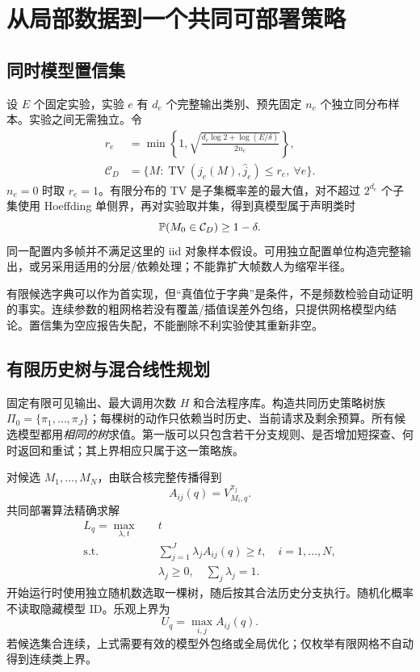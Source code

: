 \documentclass[11pt,a4paper,fontset=fandol]{ctexart}
\theoremstyle{definition}\newtheorem{definition}[theorem]{定义}
\theoremstyle{remark}\newtheorem{remark}[theorem]{说明}
\numberwithin{equation}{section}
\newcommand{\TV}{\operatorname{TV}}\newcommand{\osc}{\operatorname{osc}}
\newcommand{\cC}{\mathcal C}\newcommand{\cQ}{\mathcal Q}
\begin{document}
\section{从局部数据到一个共同可部署策略}
\label{sec:algorithm}
\subsection{同时模型置信集}
设 $E$ 个固定实验，实验 $e$ 有 $d_e$ 个完整输出类别、预先固定 $n_e$ 个独立同分布样本。实验之间无需独立。令
\begin{align}
 r_e&=\min\!\left\{1,\sqrt{\frac{d_e\log2+\log(E/\delta)}{2n_e}}\right\},\\
 \cC_D&=\{M:\TV(j_e(M),\widehat j_e)\le r_e,\ \forall e\}.
 \label{eq:confidence}
\end{align}
$n_e=0$ 时取 $r_e=1$。有限分布的 TV 是子集概率差的最大值，对不超过 $2^{d_e}$ 个子集使用 Hoeffding 单侧界，再对实验取并集，得到真模型属于声明类时
\begin{equation}
 \Prb(M_0\in\cC_D)\ge1-\delta.
 \label{eq:coverage}
\end{equation}
同一配置内多帧并不满足这里的 iid 对象样本假设。可用独立配置单位构造完整输出，或另采用适用的分层/依赖处理；不能靠扩大帧数人为缩窄半径。

有限候选字典可以作为首实现，但“真值位于字典”是条件，不是频数检验自动证明的事实。连续参数的粗网格若没有覆盖/插值误差外包络，只提供网格模型内结论。置信集为空应报告失配，不能删除不利实验使其重新非空。

\subsection{有限历史树与混合线性规划}
\label{sec:lp}
固定有限可见输出、最大调用次数 $H$ 和合法程序库。构造共同历史策略树族
$\Pi_0=\{\pi_1,\ldots,\pi_J\}$；每棵树的动作只依赖当时历史、当前请求及剩余预算。所有候选模型都用\emph{相同的树}求值。第一版可以只包含若干分支规则、是否增加短探查、何时返回和重试；其上界相应只属于这一策略族。

对候选 $M_1,\ldots,M_N$，由联合核完整传播得到
\begin{equation}
 A_{ij}(q)=V_{M_i,q}^{\pi_j}.
 \label{eq:matrix}
\end{equation}
共同部署算法精确求解
\begin{align}
 L_q=\max_{\lambda,t}\quad &t\label{eq:lp}\\
 \text{s.t.}\quad &\sum_{j=1}^J\lambda_j A_{ij}(q)\ge t,
 \quad i=1,\ldots,N,\nonumber\\
 &\lambda_j\ge0,\quad\sum_j\lambda_j=1.\nonumber
\end{align}
开始运行时使用独立随机数选取一棵树，随后按其合法历史分支执行。随机化概率不读取隐藏模型 ID。乐观上界为
\begin{equation}
 U_q=\max_{i,j}A_{ij}(q).
 \label{eq:upper}
\end{equation}
若候选集合连续，上式需要有效的模型外包络或全局优化；仅枚举有限网格不自动得到连续类上界。
\end{document}
